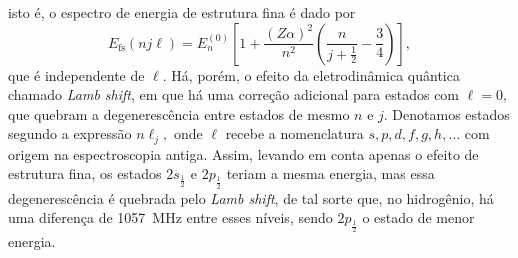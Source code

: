 isto é, o espectro de energia de estrutura fina é dado por
\begin{equation*}
   E_\mathrm{fs}(nj\ell) = E_n^{(0)}\left[1 + \frac{(Z\alpha)^2}{n^2}\left(\frac{n}{j + \frac12} - \frac34\right)\right],
\end{equation*}
que é independente de \(\ell.\) Há, porém, o efeito da eletrodinâmica quântica chamado \emph{Lamb shift}, em que há uma correção adicional para estados com \(\ell = 0,\) que quebram a degenerescência entre estados de mesmo \(n\) e \(j\). Denotamos estados segundo a expressão \(n \ell_j,\) onde \(\ell\) recebe a nomenclatura \(s, p, d, f,g,h, \dots\) com origem na espectroscopia antiga. Assim, levando em conta apenas o efeito de estrutura fina, os estados \(2s_{\frac12}\) e \(2p_{\frac12}\) teriam a mesma energia, mas essa degenerescência é quebrada pelo \emph{Lamb shift}, de tal sorte que, no hidrogênio, há uma diferença de \SI{1057}{MHz} entre esses níveis, sendo \(2p_{\frac12}\) o estado de menor energia.
